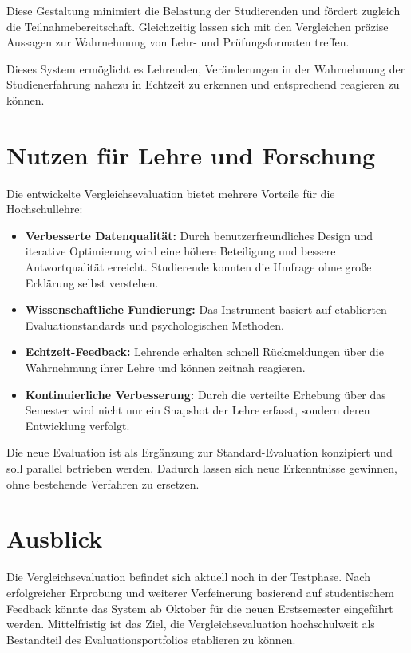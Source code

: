 \documentclass[12pt,a4paper,oneside]{article}
\begin{document}
Diese Gestaltung minimiert die Belastung der Studierenden und fördert zugleich die Teilnahmebereitschaft. Gleichzeitig lassen sich mit den Vergleichen präzise Aussagen zur Wahrnehmung von Lehr- und Prüfungsformaten treffen.

Dieses System ermöglicht es Lehrenden, Veränderungen in der Wahrnehmung der Studienerfahrung nahezu in Echtzeit zu erkennen und entsprechend reagieren zu können.

\section{Nutzen für Lehre und Forschung}

Die entwickelte Vergleichsevaluation bietet mehrere Vorteile für die Hochschullehre:

\begin{itemize}
    \item \textbf{Verbesserte Datenqualität:} Durch benutzerfreundliches Design und iterative Optimierung wird eine höhere Beteiligung und bessere Antwortqualität erreicht. Studierende konnten die Umfrage ohne große Erklärung selbst verstehen.
    \item \textbf{Wissenschaftliche Fundierung:} Das Instrument basiert auf etablierten Evaluationstandards und psychologischen Methoden.
    \item \textbf{Echtzeit-Feedback:} Lehrende erhalten schnell Rückmeldungen über die Wahrnehmung ihrer Lehre und können zeitnah reagieren.
    \item \textbf{Kontinuierliche Verbesserung:} Durch die verteilte Erhebung über das Semester wird nicht nur ein Snapshot der Lehre erfasst, sondern deren Entwicklung verfolgt.
\end{itemize}

Die neue Evaluation ist als Ergänzung zur Standard-Evaluation konzipiert und soll parallel betrieben werden. Dadurch lassen sich neue Erkenntnisse gewinnen, ohne bestehende Verfahren zu ersetzen.

\section{Ausblick}

Die Vergleichsevaluation befindet sich aktuell noch in der Testphase. Nach erfolgreicher Erprobung und weiterer Verfeinerung basierend auf studentischem Feedback könnte das System ab Oktober für die neuen Erstsemester eingeführt werden. Mittelfristig ist das Ziel, die Vergleichsevaluation hochschulweit als Bestandteil des Evaluationsportfolios etablieren zu können.
\end{document}
